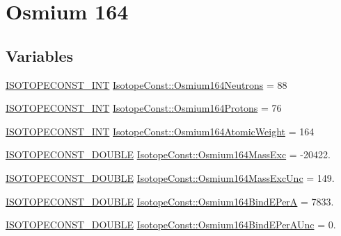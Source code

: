 \hypertarget{group___isotope_const-_osmium-_os164}{}\section{Osmium 164}
\label{group___isotope_const-_osmium-_os164}
\subsection*{Variables}
\begin{DoxyCompactItemize}
\item 
\mbox{\hyperlink{group___isotope_const-_macros_ga5f18360b3e99483a35c32d789e62621c}{I\+S\+O\+T\+O\+P\+E\+C\+O\+N\+S\+T\+\_\+\+I\+NT}} \mbox{\hyperlink{group___isotope_const-_osmium-_os164_gadb0dac1ae9e185ff007afad059c94208}{Isotope\+Const\+::\+Osmium164\+Neutrons}} = 88
\item 
\mbox{\hyperlink{group___isotope_const-_macros_ga5f18360b3e99483a35c32d789e62621c}{I\+S\+O\+T\+O\+P\+E\+C\+O\+N\+S\+T\+\_\+\+I\+NT}} \mbox{\hyperlink{group___isotope_const-_osmium-_os164_gaf33de3632f0889cd4c248559579bc9fc}{Isotope\+Const\+::\+Osmium164\+Protons}} = 76
\item 
\mbox{\hyperlink{group___isotope_const-_macros_ga5f18360b3e99483a35c32d789e62621c}{I\+S\+O\+T\+O\+P\+E\+C\+O\+N\+S\+T\+\_\+\+I\+NT}} \mbox{\hyperlink{group___isotope_const-_osmium-_os164_ga76baada9015d5b9f4cbab5fa8c189fee}{Isotope\+Const\+::\+Osmium164\+Atomic\+Weight}} = 164
\item 
\mbox{\hyperlink{group___isotope_const-_macros_ga8f45a7272ce02c0b4c65c44636ed719a}{I\+S\+O\+T\+O\+P\+E\+C\+O\+N\+S\+T\+\_\+\+D\+O\+U\+B\+LE}} \mbox{\hyperlink{group___isotope_const-_osmium-_os164_ga050008063c9db8bc9f7630c6965fb93f}{Isotope\+Const\+::\+Osmium164\+Mass\+Exc}} = -\/20422.
\item 
\mbox{\hyperlink{group___isotope_const-_macros_ga8f45a7272ce02c0b4c65c44636ed719a}{I\+S\+O\+T\+O\+P\+E\+C\+O\+N\+S\+T\+\_\+\+D\+O\+U\+B\+LE}} \mbox{\hyperlink{group___isotope_const-_osmium-_os164_gaa050a47b27acc179845c083d3495eace}{Isotope\+Const\+::\+Osmium164\+Mass\+Exc\+Unc}} = 149.
\item 
\mbox{\hyperlink{group___isotope_const-_macros_ga8f45a7272ce02c0b4c65c44636ed719a}{I\+S\+O\+T\+O\+P\+E\+C\+O\+N\+S\+T\+\_\+\+D\+O\+U\+B\+LE}} \mbox{\hyperlink{group___isotope_const-_osmium-_os164_ga6780c4e188e6a5d4ee27528c8be8f475}{Isotope\+Const\+::\+Osmium164\+Bind\+E\+PerA}} = 7833.
\item 
\mbox{\hyperlink{group___isotope_const-_macros_ga8f45a7272ce02c0b4c65c44636ed719a}{I\+S\+O\+T\+O\+P\+E\+C\+O\+N\+S\+T\+\_\+\+D\+O\+U\+B\+LE}} \mbox{\hyperlink{group___isotope_const-_osmium-_os164_ga3e174cdea21eac3b6916039cec0ab362}{Isotope\+Const\+::\+Osmium164\+Bind\+E\+Per\+A\+Unc}} = 0.

\end{DoxyCompactItemize}

